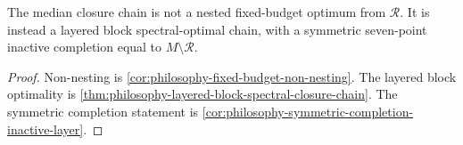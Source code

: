 \begin{theorem}
\label{thm:philosophy-block-optimal-budget-frustrated-spectral-closure}
The median closure chain is not a nested fixed-budget optimum from
$\mathcal{R}$. It is instead a layered block spectral-optimal chain,
with a symmetric seven-point inactive completion equal to
$M\setminus\mathcal{R}$.
\end{theorem}
\begin{proof}
Non-nesting is \autoref{cor:philosophy-fixed-budget-non-nesting}. The
layered block optimality is
\autoref{thm:philosophy-layered-block-spectral-closure-chain}. The
symmetric completion statement is
\autoref{cor:philosophy-symmetric-completion-inactive-layer}.
\end{proof}

